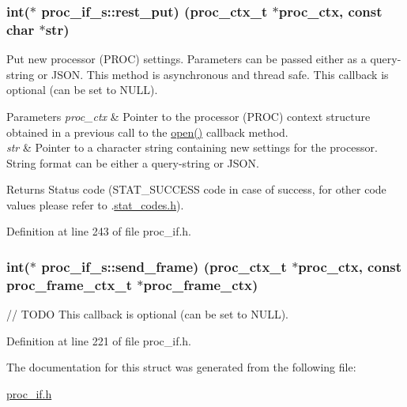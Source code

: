 \subsubsection[{\texorpdfstring{rest\+\_\+put}{rest_put}}]{\setlength{\rightskip}{0pt plus 5cm}int($\ast$ proc\+\_\+if\+\_\+s\+::rest\+\_\+put) ({\bf proc\+\_\+ctx\+\_\+t} $\ast$proc\+\_\+ctx, const char $\ast$str)}\hypertarget{structproc__if__s_acb4d2c240c52904ebd6904f54b1a9b78}{}\label{structproc__if__s_acb4d2c240c52904ebd6904f54b1a9b78}
Put new processor (P\+R\+OC) settings. Parameters can be passed either as a query-\/string or J\+S\+ON. This method is asynchronous and thread safe. This callback is optional (can be set to N\+U\+LL). 
\begin{DoxyParams}{Parameters}
{\em proc\+\_\+ctx} & Pointer to the processor (P\+R\+OC) context structure obtained in a previous call to the \textquotesingle{}\hyperlink{structproc__if__s_a34999576771394dfb721463c8455ba06}{open()}\textquotesingle{} callback method. \\
\hline
{\em str} & Pointer to a character string containing new settings for the processor. String format can be either a query-\/string or J\+S\+ON. \\
\hline
\end{DoxyParams}
\begin{DoxyReturn}{Returns}
Status code (S\+T\+A\+T\+\_\+\+S\+U\+C\+C\+E\+SS code in case of success, for other code values please refer to .\hyperlink{stat__codes_8h}{stat\+\_\+codes.\+h}). 
\end{DoxyReturn}


Definition at line 243 of file proc\+\_\+if.\+h.

\subsubsection[{\texorpdfstring{send\+\_\+frame}{send_frame}}]{\setlength{\rightskip}{0pt plus 5cm}int($\ast$ proc\+\_\+if\+\_\+s\+::send\+\_\+frame) ({\bf proc\+\_\+ctx\+\_\+t} $\ast$proc\+\_\+ctx, const {\bf proc\+\_\+frame\+\_\+ctx\+\_\+t} $\ast$proc\+\_\+frame\+\_\+ctx)}\hypertarget{structproc__if__s_a0393cc5e598e19951d447a926c364e3f}{}\label{structproc__if__s_a0393cc5e598e19951d447a926c364e3f}
// T\+O\+DO This callback is optional (can be set to N\+U\+LL). 

Definition at line 221 of file proc\+\_\+if.\+h.



The documentation for this struct was generated from the following file\+:\begin{DoxyCompactItemize}
\item 
\hyperlink{proc__if_8h}{proc\+\_\+if.\+h}\end{DoxyCompactItemize}
